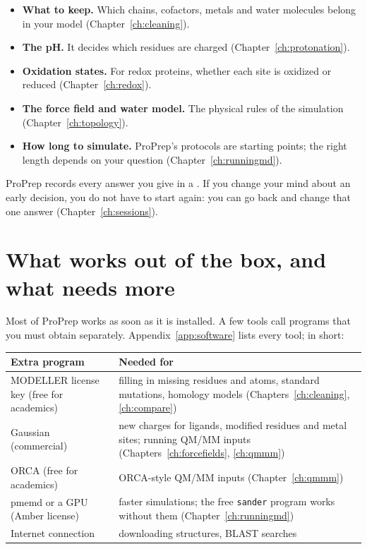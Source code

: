 \begin{itemize}
  \item \textbf{What to keep.} Which chains, cofactors, metals and water
        molecules belong in your model (Chapter~\ref{ch:cleaning}).
  \item \textbf{The pH.} It decides which residues are charged
        (Chapter~\ref{ch:protonation}).
  \item \textbf{Oxidation states.} For redox proteins, whether each site is
        oxidized or reduced (Chapter~\ref{ch:redox}).
  \item \textbf{The force field and water model.} The physical rules of the
        simulation (Chapter~\ref{ch:topology}).
  \item \textbf{How long to simulate.} ProPrep's protocols are starting points;
        the right length depends on your question (Chapter~\ref{ch:runningmd}).
\end{itemize}

\begin{tip}
ProPrep records every answer you give in a . If you change
your mind about an early decision, you do not have to start again: you can go
back and change that one answer (Chapter~\ref{ch:sessions}).
\end{tip}

\section{What works out of the box, and what needs more}
\label{sec:bigpicture-software}

Most of ProPrep works as soon as it is installed. A few tools call programs that
you must obtain separately. Appendix~\ref{app:software} lists every tool; in
short:

\begin{center}
\begin{tabularx}{\linewidth}{@{}lL@{}}
\toprule
\textbf{Extra program} & \textbf{Needed for} \\
\midrule
MODELLER license key (free for academics) & filling in missing residues and atoms,
  standard mutations, homology models (Chapters~\ref{ch:cleaning}, \ref{ch:compare}) \\
Gaussian (commercial) & new charges for ligands, modified residues and metal sites;
  running QM/MM inputs (Chapters~\ref{ch:forcefields}, \ref{ch:qmmm}) \\
ORCA (free for academics) & ORCA-style QM/MM inputs (Chapter~\ref{ch:qmmm}) \\
pmemd or a GPU (Amber license) & faster simulations; the free \texttt{sander}
  program works without them (Chapter~\ref{ch:runningmd}) \\
Internet connection & downloading structures, BLAST searches \\
\bottomrule
\end{tabularx}
\end{center}
